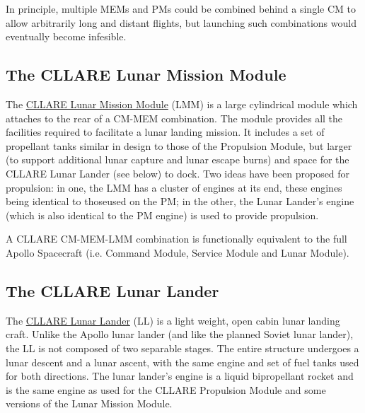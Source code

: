 \documentclass{report}
\begin{document}
In principle, multiple MEMs and PMs could be combined behind a single CM to allow arbitrarily long and distant flights, but launching such combinations would eventually become infesible.

\subsection{The CLLARE Lunar Mission Module}

The \href{http://cstart.org/wiki/CLLARE_Lunar_Mission_Module}{CLLARE Lunar Mission Module} (LMM) is a large cylindrical module which attaches to the rear of a CM-MEM combination.  The module provides all the facilities required to facilitate a lunar landing mission.  It includes a set of propellant tanks similar in design to those of the Propulsion Module, but larger (to support additional lunar capture and lunar escape burns) and space for the CLLARE Lunar Lander (see below) to dock.  Two ideas have been proposed for propulsion: in one, the LMM has a cluster of engines at its end, these engines being identical to thoseused on the PM; in the other, the Lunar Lander's engine (which is also identical to the PM engine) is used to provide propulsion.

A CLLARE CM-MEM-LMM combination is functionally equivalent to the full Apollo Spacecraft (i.e. Command Module, Service Module and Lunar Module).

\subsection{The CLLARE Lunar Lander}

The \href{http://cstart.org/wiki/CLLARE_Lunar_Lander}{CLLARE Lunar Lander} (LL) is a light weight, open cabin lunar landing craft.  Unlike the Apollo lunar lander (and like the planned Soviet lunar lander), the LL is not composed of two separable stages.  The entire structure undergoes a lunar descent and a lunar ascent, with the same engine and set of fuel tanks used for both directions.  The lunar lander's engine is a liquid bipropellant rocket and is the same engine as used for the CLLARE Propulsion Module and some versions of the Lunar Mission Module.
\end{document}
